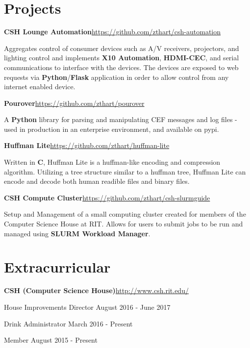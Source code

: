 \documentclass[margin,line]{resume}
\newcommand{\rurl}[1]{\hfill {\footnotesize \url{#1}}}
\begin{document}
\begin{resume}
\section{\mysidestyle Projects}
	\begin{asparablank}
		\item {\bf CSH Lounge Automation}\rurl{https://github.com/zthart/csh-automation}

		\small Aggregates control of consumer devices such as A/V receivers, projectors, and lighting control and implements \textbf{X10 Automation}, \textbf{HDMI-CEC}, and serial communications to interface with the devices. The devices are exposed to web requests via \textbf{Python}/\textbf{Flask} application in order to allow control from any internet enabled device.
		\normalsize
        \\
		\item {\bf Pourover}\rurl{https://github.com/zthart/pourover}

		\small A \textbf{Python} library for parsing and manipulating CEF messages and log files - used in production in an enterprise environment, and available on pypi.
		\normalsize
		\\
		\item {\bf Huffman Lite}\rurl{https://github.com/zthart/huffman-lite}
		
		\small Written in \textbf{C}, Huffman Lite is a huffman-like encoding and compression algorithm. Utilizing a tree structure similar to a huffman tree, Huffman Lite can encode and decode both human readible files and binary files.
		\normalsize
		\\
		\item {\bf CSH Compute Cluster}\rurl{https://github.com/zthart/csh-slurmguide}

		\small Setup and Management of a small computing cluster created for members of the Computer Science House at RIT. Allows for users to submit jobs to be run and managed using \textbf{SLURM Workload Manager}.
	\end{asparablank}
    
\section{\mysidestyle Extracurricular}
	\begin{asparablank}
		\item {\bf CSH ({\small Computer Science House})}\rurl{http://www.csh.rit.edu/}
		\small	\item House Improvements Director \hfill August 2016 - June 2017
        \small  \item Drink Administrator \hfill March 2016 - Present
        \small  \item Member \hfill August 2015 - Present
        \linebreak
        

\end{asparablank}
\end{resume}
\end{document}

